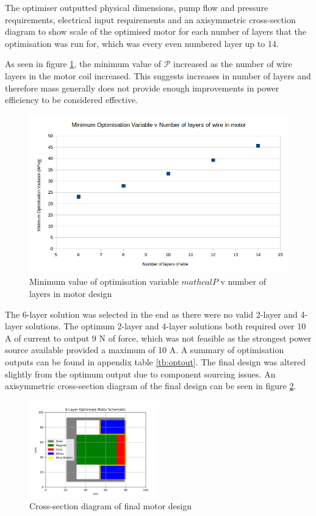 \documentclass[a4paper,12pt]{article}
\begin{document}
The optimiser outputted physical dimensions, pump flow and pressure requirements, electrical input requirements and an axisymmetric cross-section diagram to show scale of the optimised motor for each number of layers that the optimisation was run for, which was every even numbered layer up to 14.

As seen in figure \ref{fg:optvariable}, the minimum value of $\mathcal{P}$ increased as the number of wire layers in the motor coil increased. This suggests increases in number of layers and therefore mass generally does not provide enough improvements in power efficiency to be considered effective.

\begin{figure}[h!]
    \centering
    \includegraphics[width=\textwidth]{[P]_v_layers.png}
    \caption{Minimum value of optimisation variable $mathcal{P}$ v number of layers in motor design}
    \label{fg:optvariable}
\end{figure}

The 6-layer solution was selected in the end as there were no valid 2-layer and 4-layer solutions. The optimum 2-layer and 4-layer solutions both required over 10 A of current to output 9 N of force, which was not feasible as the strongest power source available provided a maximum of 10 A. A summary of optimisation outputs can be found in appendix table \ref{tb:optout}. The final design was altered slightly from the optimum output due to component sourcing issues. An axisymmetric cross-section diagram of the final design can be seen in figure \ref{fg:finalmotor}.

\begin{figure}[h!]
    \centering
    \includegraphics[width=0.5\textwidth]{finalDesign_layers.png}
    \caption{Cross-section diagram of final motor design}
    \label{fg:finalmotor}
\end{figure}
\end{document}
